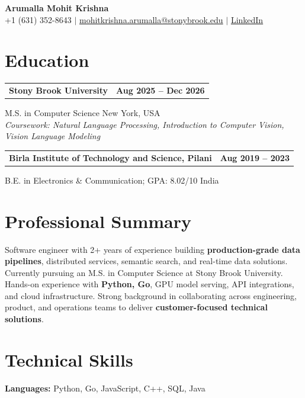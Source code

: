 \documentclass[letterpaper,10pt]{article}
\makeatletter
\newcommand{\entry}[2]{%
  \noindent
  \begin{tabularx}{\linewidth}
    {@{}>{\raggedright\arraybackslash}X@{\hspace{6pt}}r@{}}
    \textbf{#1} & #2
  \end{tabularx}\par
}
\makeatother
\begin{document}
\begin{center}
    {\LARGE\bfseries Arumalla Mohit Krishna}\\[3pt]
    +1 (631) 352-8643 $|$
    \href{mailto:mohitkrishna.arumalla@stonybrook.edu}
    {mohitkrishna.arumalla@stonybrook.edu} $|$
    \href{https://linkedin.com/in/mohit-krishna-arumalla}
    {LinkedIn}
\end{center}
\vspace{-8pt}

\section{Education}

\entry
  {\textbf{Stony Brook University}}
  {\textbf{Aug 2025 -- Dec 2026}}

M.S. in Computer Science \hfill New York, USA\\
\textit{
Coursework: Natural Language Processing,
Introduction to Computer Vision, Vision Language Modeling
}
\vspace{3pt}

\entry
  {\textbf{Birla Institute of Technology and Science, Pilani}}
  {\textbf{Aug 2019 -- 2023}}

B.E. in Electronics \& Communication; GPA: 8.02/10 \hfill India
\section{Professional Summary}

Software engineer with 2+ years of experience building \textbf{production-grade data pipelines}, 
distributed services, semantic search, and real-time data solutions. 
Currently pursuing an M.S. in Computer Science at Stony Brook University. 
Hands-on experience with \textbf{Python, Go}, GPU model serving, API integrations, and cloud infrastructure. 
Strong background in collaborating across engineering, product, and operations teams to deliver \textbf{customer-focused technical solutions}.

\section{Technical Skills}

\textbf{Languages:}
Python, Go, JavaScript, C++, SQL, Java\\
\end{document}
